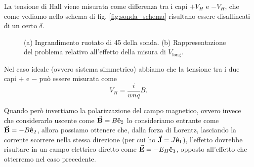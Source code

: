 \documentclass[fleqn,varvw,preprintnumbers,citeautoscript]{memo}
\newcommand\vlong{V_\text{long}}
\begin{document}
La tensione di Hall viene misurata come differenza tra i capi $+V_H$ e $-V_H$, che come vediamo nello schema di fig. \ref{fig:sonda_schema} risultano essere disallineati di un certo $\delta$. 

\begin{figure}
    \centering
    \hspace{1cm}
    \subfloat[][]{\label{fig:sonda_schema}}
    \caption{(a) Ingrandimento ruotato di \SI{45}{\deg} della sonda. (b) Rappresentazione del problema relativo all'effetto della misura di $\vlong$.}
\end{figure}

Nel caso ideale (ovvero sistema simmetrico) abbiamo che la tensione tra i due capi $+$ e $-$ può essere misurata come \begin{equation}
    V_H = \frac{i}{wnq}B. 
\end{equation} 

Quando però invertiamo la polarizzazione del campo magnetico, ovvero invece che considerarlo uscente come $\va{B} = B\vu{e}_2$ lo consideriamo entrante come $\va{B} = -B\vu{e}_2$, allora possiamo ottenere che, dalla forza di Lorentz, lasciando la corrente scorrere nella stessa direzione (per cui ho $\va{J} = J\vu{e}_1$), l'effetto dovrebbe risultare in un campo elettrico diretto come $\va{E} = -E_H \vu{e}_3$, opposto all'effetto che otterremo nel caso precedente. 
\end{document}
